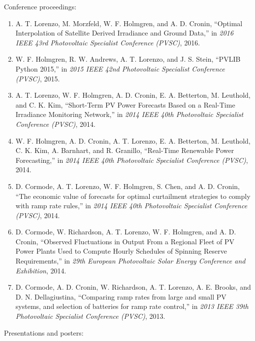 \noindent Conference proceedings:
\begin{enumerate}
\item A. T. Lorenzo, M. Morzfeld, W. F. Holmgren, and A. D. Cronin,
``Optimal Interpolation of Satellite Derived Irradiance and Ground
Data,'' in \emph{2016 IEEE 43rd Photovoltaic Specialist Conference
(PVSC)}, 2016.

\item W. F. Holmgren, R. W. Andrews, A. T. Lorenzo, and J. S. Stein,
``PVLIB Python 2015,'' in \emph{2015 IEEE 42nd Photovoltaic Specialist
Conference (PVSC)}, 2015.

\item A. T. Lorenzo, W. F. Holmgren, A. D. Cronin, E. A. Betterton,
M. Leuthold, and C. K. Kim, ``Short-Term PV Power Forecasts Based on a
Real-Time Irradiance Monitoring Network,'' in \emph{2014 IEEE 40th
Photovoltaic Specialist Conference (PVSC)}, 2014.

\item W. F. Holmgren, A. D. Cronin, A. T. Lorenzo, E. A. Betterton,
M. Leuthold, C. K. Kim, A. Barnhart, and R. Granillo, ``Real-Time
Renewable Power Forecasting,'' in \emph{2014 IEEE 40th Photovoltaic
Specialist Conference (PVSC)}, 2014.

\item D. Cormode, A. T. Lorenzo, W. F. Holmgren, S. Chen, and
A. D. Cronin, ``The economic value of forecasts for optimal
curtailment strategies to comply with ramp rate rules,'' in \emph{2014
IEEE 40th Photovoltaic Specialist Conference (PVSC)}, 2014.

\item D. Cormode, W. Richardson, A. T. Lorenzo, W. F. Holmgren, and
  A. D. Cronin, ``Observed Fluctuations in Output From a Regional
  Fleet of PV Power Plants Used to Compute Hourly Schedules of
  Spinning Reserve Requirements,'' in \emph{29th European Photovoltaic
  Solar Energy Conference and Exhibition}, 2014.

\item D. Cormode, A. D. Cronin, W. Richardson, A. T. Lorenzo,
A. E. Brooks, and D. N. Dellagiustina, ``Comparing ramp rates from
large and small PV systems, and selection of batteries for ramp rate
control,'' in \emph{2013 IEEE 39th Photovoltaic Specialist Conference
(PVSC)}, 2013.

\end{enumerate}


\noindent Presentations and posters:

